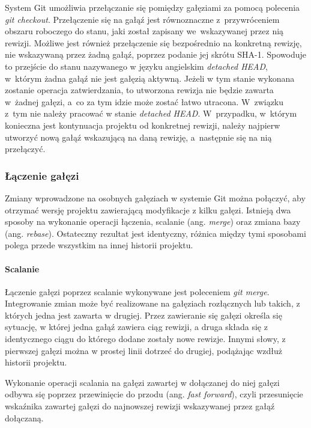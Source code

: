 \documentclass[11pt,a4paper,polish,thesis]{dcsbook}
\begin{document}
	System Git umożliwia przełączanie się pomiędzy gałęziami za pomocą polecenia \textit{git checkout}. Przełączenie się na gałąź jest równoznaczne z~przywróceniem obszaru roboczego do stanu, jaki został zapisany we~wskazywanej przez nią rewizji. Możliwe jest również przełączenie się bezpośrednio na konkretną rewizję, nie wskazywaną przez żadną gałąź, poprzez podanie jej skrótu SHA-1. Spowoduje to przejście do stanu nazywanego w języku angielskim \textit{detached HEAD}, w~którym żadna gałąź nie jest gałęzią aktywną. Jeżeli w tym stanie wykonana zostanie operacja zatwierdzania, to utworzona rewizja nie będzie zawarta w~żadnej gałęzi, a~co za tym idzie może zostać łatwo utracona. W~związku z~tym nie należy pracować w stanie \textit{detached HEAD}. W~przypadku, w~którym konieczna jest kontynuacja projektu od konkretnej rewizji, należy najpierw utworzyć nową gałąź wskazującą na daną rewizję, a~następnie się na nią przełączyć.

	\subsubsection{Łączenie gałęzi}
	Zmiany wprowadzone na osobnych gałęziach w systemie Git można połączyć, aby otrzymać wersję projektu zawierającą modyfikacje z kilku gałęzi. Istnieją dwa sposoby na wykonanie operacji łączenia, scalanie (ang. \textit{merge}) oraz zmiana bazy (ang. \textit{rebase}). Ostateczny rezultat jest identyczny, różnica między tymi sposobami polega przede wszystkim na innej historii projektu. 

	\paragraph{Scalanie}

	Łączenie gałęzi poprzez scalanie wykonywane jest poleceniem \textit{git merge}. Integrowanie zmian może być realizowane na gałęziach rozłącznych lub takich, z których jedna jest zawarta w drugiej. Przez zawieranie się gałęzi określa się sytuację, w której jedna gałąź zawiera ciąg rewizji, a druga składa się z identycznego ciągu do którego dodane zostały nowe rewizje. Innymi słowy, z pierwszej gałęzi można w prostej linii dotrzeć do drugiej, podążając wzdłuż historii projektu.

	Wykonanie operacji scalania na gałęzi zawartej w dołączanej do niej gałęzi odbywa się poprzez przewinięcie do przodu (ang. \textit{fast forward}), czyli przesunięcie wskaźnika zawartej gałęzi do najnowszej rewizji wskazywanej przez gałąź dołączaną.
\end{document}
